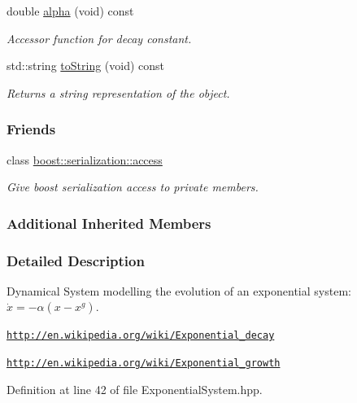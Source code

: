 \begin{DoxyCompactItemize}
double \hyperlink{classDmpBbo_1_1ExponentialSystem_aee36d92680cc62cfd30ad121aa8bb47e}{alpha} (void) const 
\begin{DoxyCompactList}\small\item\em Accessor function for decay constant. \end{DoxyCompactList}\item 
std\+::string \hyperlink{classDmpBbo_1_1ExponentialSystem_a1aca816b42cf0d36118be0ab91120d77}{to\+String} (void) const 
\begin{DoxyCompactList}\small\item\em Returns a string representation of the object. \end{DoxyCompactList}\end{DoxyCompactItemize}
\subsubsection*{Friends}
\begin{DoxyCompactItemize}
\item 
class \hyperlink{classDmpBbo_1_1ExponentialSystem_ac98d07dd8f7b70e16ccb9a01abf56b9c}{boost\+::serialization\+::access}
\begin{DoxyCompactList}\small\item\em Give boost serialization access to private members. \end{DoxyCompactList}\end{DoxyCompactItemize}
\subsubsection*{Additional Inherited Members}


\subsubsection{Detailed Description}
Dynamical System modelling the evolution of an exponential system\+: $\dot{x} = -\alpha (x-x^g)$. 

\href{http://en.wikipedia.org/wiki/Exponential_decay}{\tt http\+://en.\+wikipedia.\+org/wiki/\+Exponential\+\_\+decay}

\href{http://en.wikipedia.org/wiki/Exponential_growth}{\tt http\+://en.\+wikipedia.\+org/wiki/\+Exponential\+\_\+growth} 

Definition at line 42 of file Exponential\+System.\+hpp.



